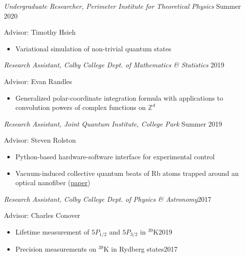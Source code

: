 \documentclass[10pt]{article}
\begin{document}
\noindent \textit{Undergraduate Researcher, Perimeter Institute for Theoretical Physics} \hfill Summer 2020

\vspace{2pt}
Advisor: Timothy Hsieh 
\vspace{-5pt}
\begin{itemize}
	\setlength\itemsep{-4pt}
	\item Variational simulation of non-trivial quantum states 
\end{itemize}


\noindent \textit{Research Assistant, Colby College Dept. of Mathematics \& Statistics} \hfill 2019

\vspace{2pt}
Advisor: Evan Randles 
\vspace{-5pt}
\begin{itemize}
	\setlength\itemsep{-4pt}
	\item Generalized polar-coordinate integration formula with applications to convolution powers of complex functions on $\mathbb{Z}^d$
\end{itemize}


\noindent \textit{Research Assistant, Joint Quantum Institute, College Park} \hfill Summer 2019

\vspace{2pt}
Advisor:  Steven Rolston
\vspace{-5pt}
\begin{itemize}
	\setlength\itemsep{-4pt}
	\item Python-based hardware-software interface for experimental control
	\item Vacuum-induced collective quantum beats of Rb atoms trapped around an optical nanofiber
	(\href{https://arxiv.org/abs/2102.11982}{paper})
\end{itemize}

\noindent \textit{Research Assistant, Colby College Dept. of Physics \& Astronomy}\hfill 2017

\vspace{2pt}
Advisor: Charles Conover 
\vspace{-5pt}
\begin{itemize}
	\setlength\itemsep{-4pt}
	\item Lifetime measurement of $5P_{1/2}$ and $5P_{3/2}$ in $^{\text{39}}$K\hfill 2019
	\item Precision measurements on $^{\text{39}}$K in Rydberg states\hfill 2017 
\end{itemize}
\end{document}
